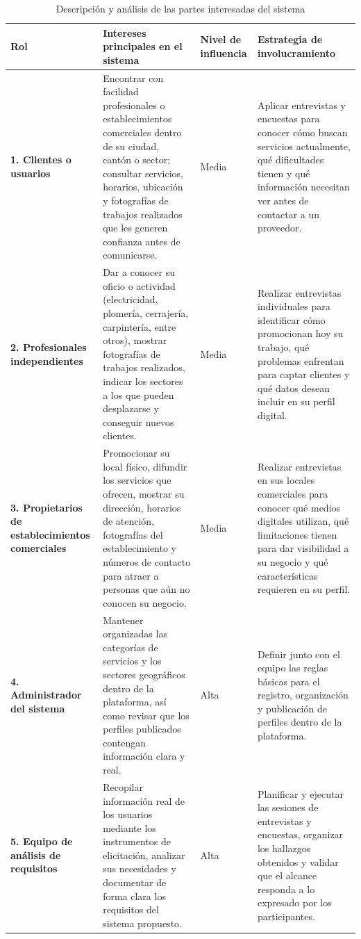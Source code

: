 \documentclass[11pt,a4paper]{article}
\renewcommand{\arraystretch}{1.22}
\begin{document}
\begin{table}[H]
\centering
\caption{Descripci\'on y an\'alisis de las partes interesadas del sistema}
\label{tab:stakeholders}
\footnotesize
\renewcommand{\arraystretch}{1.1}
\begin{tabularx}{\textwidth}{|L{3.1cm}|Y|C{2.0cm}|Y|}
\hline
{}
\textbf{Rol} & \textbf{Intereses principales en el sistema} & \textbf{Nivel de influencia} & \textbf{Estrategia de involucramiento} \\
\hline
\textbf{1. Clientes o usuarios} & Encontrar con facilidad profesionales o establecimientos comerciales dentro de su ciudad, cant\'on o sector; consultar servicios, horarios, ubicaci\'on y fotograf\'ias de trabajos realizados que les generen confianza antes de comunicarse. & Media & Aplicar entrevistas y encuestas para conocer c\'omo buscan servicios actualmente, qu\'e dificultades tienen y qu\'e informaci\'on necesitan ver antes de contactar a un proveedor. \\
\hline
\textbf{2. Profesionales independientes} & Dar a conocer su oficio o actividad (electricidad, plomer\'ia, cerrajer\'ia, carpinter\'ia, entre otros), mostrar fotograf\'ias de trabajos realizados, indicar los sectores a los que pueden desplazarse y conseguir nuevos clientes. & Media & Realizar entrevistas individuales para identificar c\'omo promocionan hoy su trabajo, qu\'e problemas enfrentan para captar clientes y qu\'e datos desean incluir en su perfil digital. \\
\hline
\textbf{3. Propietarios de establecimientos comerciales} & Promocionar su local f\'isico, difundir los servicios que ofrecen, mostrar su direcci\'on, horarios de atenci\'on, fotograf\'ias del establecimiento y n\'umeros de contacto para atraer a personas que a\'un no conocen su negocio. & Media & Realizar entrevistas en sus locales comerciales para conocer qu\'e medios digitales utilizan, qu\'e limitaciones tienen para dar visibilidad a su negocio y qu\'e caracter\'isticas requieren en su perfil. \\
\hline
\textbf{4. Administrador del sistema} & Mantener organizadas las categor\'ias de servicios y los sectores geogr\'aficos dentro de la plataforma, as\'i como revisar que los perfiles publicados contengan informaci\'on clara y real. & Alta & Definir junto con el equipo las reglas b\'asicas para el registro, organizaci\'on y publicaci\'on de perfiles dentro de la plataforma. \\
\hline
\textbf{5. Equipo de an\'alisis de requisitos} & Recopilar informaci\'on real de los usuarios mediante los instrumentos de elicitaci\'on, analizar sus necesidades y documentar de forma clara los requisitos del sistema propuesto. & Alta & Planificar y ejecutar las sesiones de entrevistas y encuestas, organizar los hallazgos obtenidos y validar que el alcance responda a lo expresado por los participantes. \\

\end{tabularx}
\end{table}
\end{document}
